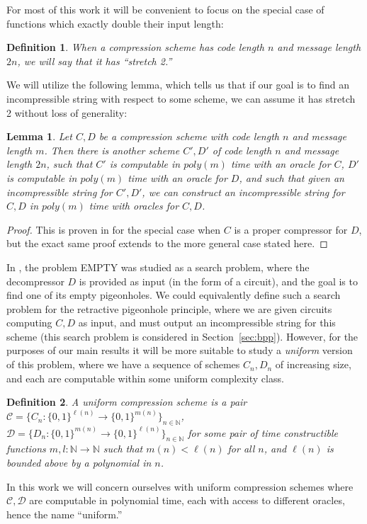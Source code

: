 \documentclass[11pt]{article}
\newtheorem{lemma}{Lemma}
\newtheorem{definition}{Definition}
\newcommand{\B}{\{0,1\}}
\begin{document}
For most of this work it will be convenient to focus on the special case of functions which exactly double their input length:
\begin{definition}
When a compression scheme has code length $n$ and message length $2n$, we will say that it has ``stretch 2.''
\end{definition}

We will utilize the following lemma, which tells us that if our goal is to find an incompressible string with respect to some scheme, we can assume it has stretch 2 without loss of generality:
\begin{lemma}\label{lem:non-uniform-stretching}
Let $C,D$ be a compression scheme with code length $n$ and message length $m$. Then there is another scheme $C',D'$ of code length $n$ and message length $2n$, such that $C'$ is computable in $poly(m)$ time with an oracle for $C$, $D'$ is computable in $poly(m)$ time with an oracle for $D$, and such that given an incompressible string for $C',D'$, we can construct an incompressible string for $C,D$ in $poly(m)$ time with oracles for $C,D$.
\end{lemma}
\begin{proof}
This is proven in \cite{Korten} for the special case when $C$ is a proper compressor for $D$, but the exact same proof extends to the more general case stated here.
\end{proof}

In \cite{Korten}, the problem {\sc EMPTY} was studied as a search problem, where the decompressor $D$ is provided as input (in the form of a circuit), and the goal is to find one of its empty pigeonholes. We could equivalently define such a search problem for the retractive pigeonhole principle, where we are given circuits computing $C,D$ as input, and must output an incompressible string for this scheme (this search problem is considered in Section~\ref{sec:bpp}). However, for the purposes of our main results it will be more suitable to study a \emph{uniform} version of this problem, where we have a sequence of schemes $C_n,D_n$ of increasing size, and each are computable within some uniform complexity class.
\begin{definition}
A uniform compression scheme is a pair $\mathcal{C} = \{C_n\colon \B^{\ell(n)} \rightarrow \B^{m(n)}\}_{n \in \mathbb{N}}$, $\mathcal{D} = \{D_n\colon \B^{m(n)} \rightarrow \B^{\ell(n)}\}_{n \in \mathbb{N}}$ for some pair of time constructible functions $m,l\colon\mathbb{N} \rightarrow \mathbb{N}$ such that $m(n) < \ell(n)$ for all $n$, and $\ell(n)$ is bounded above by a polynomial in $n$.
\end{definition}
In this work we will concern ourselves with uniform compression schemes where $\mathcal{C},\mathcal{D}$ are computable in polynomial time, each with access to different oracles, hence the name ``uniform.''
\end{document}
